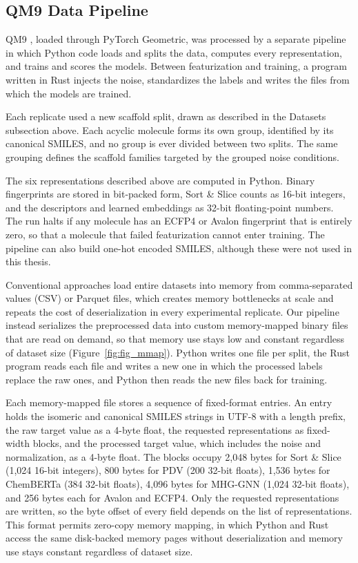 \subsection{QM9 Data Pipeline}

QM9 \citep{Ramakrishnan2014}, loaded through PyTorch Geometric, was processed by a separate pipeline
in which Python code loads and splits the data, computes every representation, and trains and scores
the models. Between featurization and training, a program written in Rust injects the noise,
standardizes the labels and writes the files from which the models are trained.

Each replicate used a new scaffold split, drawn as described in the Datasets subsection above. Each
acyclic molecule forms its own group, identified by its canonical SMILES, and no group is ever divided
between two splits. The same grouping defines the scaffold families targeted by the grouped noise
conditions.

The six representations described above are computed in Python. Binary fingerprints are stored in
bit-packed form, Sort \& Slice counts as 16-bit integers, and the descriptors and learned embeddings
as 32-bit floating-point numbers. The run halts if any molecule has an ECFP4 or Avalon fingerprint
that is entirely zero, so that a molecule that failed featurization cannot enter training. The
pipeline can also build one-hot encoded SMILES, although these were not used in this thesis.

Conventional approaches load entire datasets into memory from comma-separated values (CSV) or Parquet files, which creates memory bottlenecks at scale and repeats the cost of deserialization in every experimental replicate. Our pipeline instead serializes the preprocessed data into custom memory-mapped binary files that are read on demand, so that memory use stays low and constant regardless of dataset size (Figure~\ref{fig:fig_mmap}). Python writes one file per split, the Rust program reads each file and writes a new one in which the processed labels replace the raw ones, and Python then reads the new files back for training.

Each memory-mapped file stores a sequence of fixed-format entries. An entry holds the isomeric and canonical SMILES strings in UTF-8 with a length prefix, the raw target value as a 4-byte float, the requested representations as fixed-width blocks, and the processed target value, which includes the noise and normalization, as a 4-byte float. The blocks occupy 2,048 bytes for Sort \& Slice (1,024 16-bit integers), 800 bytes for PDV (200 32-bit floats), 1,536 bytes for ChemBERTa (384 32-bit floats), 4,096 bytes for MHG-GNN (1,024 32-bit floats), and 256 bytes each for Avalon and ECFP4. Only the requested representations are written, so the byte offset of every field depends on the list of representations. This format permits zero-copy memory mapping, in which Python and Rust access the same disk-backed memory pages without deserialization and memory use stays constant regardless of dataset size.

